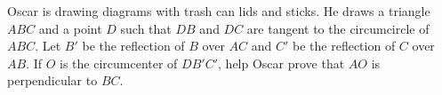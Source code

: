 Oscar is drawing diagrams with trash can lids and sticks. He draws a triangle $ABC$ and a point $D$ such that $DB$ and $DC$ are tangent to the circumcircle of $ABC$. Let $B'$ be the reflection of $B$ over $AC$ and $C'$ be the reflection of $C$ over $AB$. If $O$ is the circumcenter of $DB'C'$, help Oscar prove that $AO$ is perpendicular to $BC$.